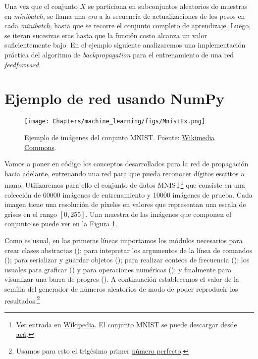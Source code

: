 Una vez que el conjunto $X$ se particiona en subconjuntos aleatorios de muestras en \textit{minibatch}, se llama una \textit{era} a la secuencia de actualizaciones de los pesos en cada \textit{minibatch}, hasta que se recorre el conjunto completo de aprendizaje. Luego, se iteran sucesivas eras hasta que la función costo alcanza un valor suficientemente bajo. En el ejemplo siguiente analizaremos una implementación práctica del algoritmo de \textit{backpropagation} para el entrenamiento de una red \textit{feedforward}. 


\section{Ejemplo de red usando NumPy}

\begin{figure}
    \begin{center}
    \texttt{[image: Chapters/machine\_learning/figs/MnistEx.png]}
\end{center}
    \caption{Ejemplo de imágenes del conjunto MNIST. Fuente: \href{https://commons.wikimedia.org/w/index.php?curid=132282871}{Wikimedia Commons}.}
    \label{fig:mnist}
\end{figure}

Vamos a poner en código los conceptos desarrollados para la red de propagación hacia adelante, entrenando una red para que pueda reconocer dígitos escritos a mano. Utilizaremos para ello el conjunto de datos MNIST\footnote{Ver entrada en \href{https://es.wikipedia.org/wiki/Base\_de\_datos\_MNIST}{Wikipedia}. El conjunto MNIST se puede descargar desde \href{https://www.kaggle.com/datasets/oddrationale/mnist-in-csv}{acá}.} que consiste en una colección de \num{60000} imágenes de entrenamiento y \num{10000} imágenes de prueba. Cada imagen tiene una resolución de  píxeles en valores que representan una escala de grises en el rango $[0, 255]$. Una muestra de las imágenes que componen el conjunto se puede ver en la Figura \ref{fig:mnist}. 

Como es usual, en las primeras líneas importamos los módulos necesarios para crear clases abstractas (); para intepretar los argumentos de la línea de comandos (); para serializar y guardar objetos (); para realizar conteos de frecuencia (); los usuales para graficar () y para operaciones numéricas (); y finalmente para visualizar una barra de progres (). A continuación establecemos el valor de la semilla del generador de números aleatorios de modo de poder reproducir los resultados.\footnote{Usamos para esto el trigésimo primer \href{https://es.wikipedia.org/wiki/Número\_perfecto}{número perfecto}.}

